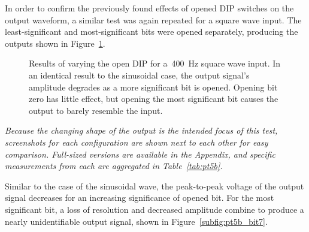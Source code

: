 In order to confirm the previously found effects of opened DIP switches on the output waveform, a similar test was again repeated for a square wave input.  The least-significant and most-significant bits were opened separately, producing the outputs shown in Figure~\ref{fig:pt5b}.
%
\begin{figure}[H]
	\centering
	\quad

	\parbox{.8\textwidth}{
	\caption[\SI{400}{\hertz} Square Wave --- DIP Switches]{Results of varying the open DIP for a~\SI{400}{\hertz} square wave input.  In an identical result to the sinusoidal case, the output signal's amplitude degrades as a more significant bit is opened.  Opening bit zero has little effect, but opening the most significant bit causes the output to barely resemble the input.}
	\label{fig:pt5b}}
\end{figure}
%
\emph{Because the changing shape of the output is the intended focus of this test, screenshots for each configuration are shown next to each other for easy comparison.  Full-sized versions are available in the Appendix, and specific measurements from each are aggregated in Table~\ref{tab:pt5b}.}
%
\begin{table}[H]
	\centering
	
	\parbox{.6\textwidth}{
	\caption[]{}
	\label{tab:pt5b}}
\end{table}
%
Similar to the case of the sinusoidal wave, the peak-to-peak voltage of the output signal decreases for an increasing significance of opened bit.  For the most significant bit, a loss of resolution and decreased amplitude combine to produce a nearly unidentifiable output signal, shown in Figure~\ref{subfig:pt5b_bit7}.

